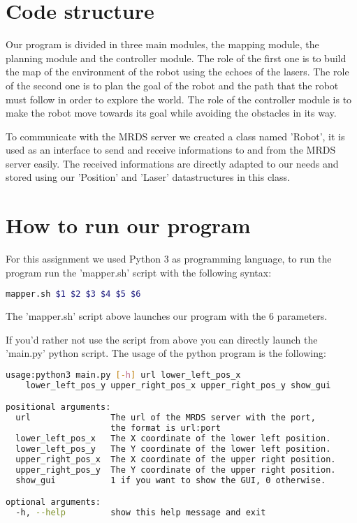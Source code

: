 \section{Code structure}

Our program is divided in three main modules, the mapping module, the planning module and the controller module.
The role of the first one is to build the map of the environment of the robot using the echoes of the lasers.
The role of the second one is to plan the goal of the robot and the path that the robot must follow in order to explore the world.
The role of the controller module is to make the robot move towards its goal while avoiding the obstacles in its way.

To communicate with the MRDS server we created a class named 'Robot', it is used as an interface to send and receive informations to and from the MRDS server easily.
The received informations are directly adapted to our needs and stored using our 'Position' and 'Laser' datastructures in this class.

\section{How to run our program}

For this assignment we used Python 3 as programming language, to run the program run the 'mapper.sh' script with the following syntax:
\\
\begin{lstlisting}[language=bash, basicstyle=\small]
mapper.sh $1 $2 $3 $4 $5 $6
\end{lstlisting}

The 'mapper.sh' script above launches our program with the 6 parameters.

If you'd rather not use the script from above you can directly launch the 'main.py' python script.
The usage of the python program is the following:
\\
\begin{lstlisting}[language=bash, basicstyle=\small]
usage:python3 main.py [-h] url lower_left_pos_x 
    lower_left_pos_y upper_right_pos_x upper_right_pos_y show_gui

positional arguments:
  url                The url of the MRDS server with the port, 
                     the format is url:port
  lower_left_pos_x   The X coordinate of the lower left position.
  lower_left_pos_y   The Y coordinate of the lower left position.
  upper_right_pos_x  The X coordinate of the upper right position.
  upper_right_pos_y  The Y coordinate of the upper right position.
  show_gui           1 if you want to show the GUI, 0 otherwise.

optional arguments:
  -h, --help         show this help message and exit
\end{lstlisting}
